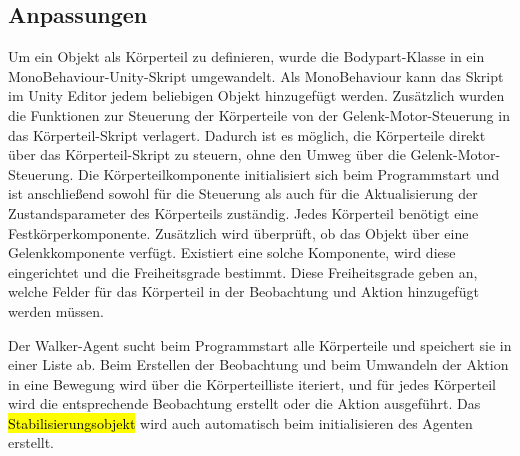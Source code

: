 \subsection{Anpassungen}
Um ein Objekt als Körperteil zu definieren, wurde die Bodypart-Klasse in ein MonoBehaviour-Unity-Skript umgewandelt. Als MonoBehaviour kann das Skript im Unity Editor jedem beliebigen Objekt hinzugefügt werden. Zusätzlich wurden die Funktionen zur Steuerung der Körperteile von der Gelenk-Motor-Steuerung in das Körperteil-Skript verlagert. Dadurch ist es möglich, die Körperteile direkt über das Körperteil-Skript zu steuern, ohne den Umweg über die Gelenk-Motor-Steuerung. Die Körperteilkomponente initialisiert sich beim Programmstart und ist anschließend sowohl für die Steuerung als auch für die Aktualisierung der Zustandsparameter des Körperteils zuständig. Jedes Körperteil benötigt eine Festkörperkomponente. Zusätzlich wird überprüft, ob das Objekt über eine Gelenkkomponente verfügt. Existiert eine solche Komponente, wird diese eingerichtet und die Freiheitsgrade bestimmt. Diese Freiheitsgrade geben an, welche Felder für das Körperteil in der Beobachtung und Aktion hinzugefügt werden müssen.

Der Walker-Agent sucht beim Programmstart alle Körperteile und speichert sie in einer Liste ab. Beim Erstellen der Beobachtung und beim Umwandeln der Aktion in eine Bewegung wird über die Körperteilliste iteriert, und für jedes Körperteil wird die entsprechende Beobachtung erstellt oder die Aktion ausgeführt.
Das \hl{Stabilisierungsobjekt} wird auch automatisch beim initialisieren des Agenten erstellt.

